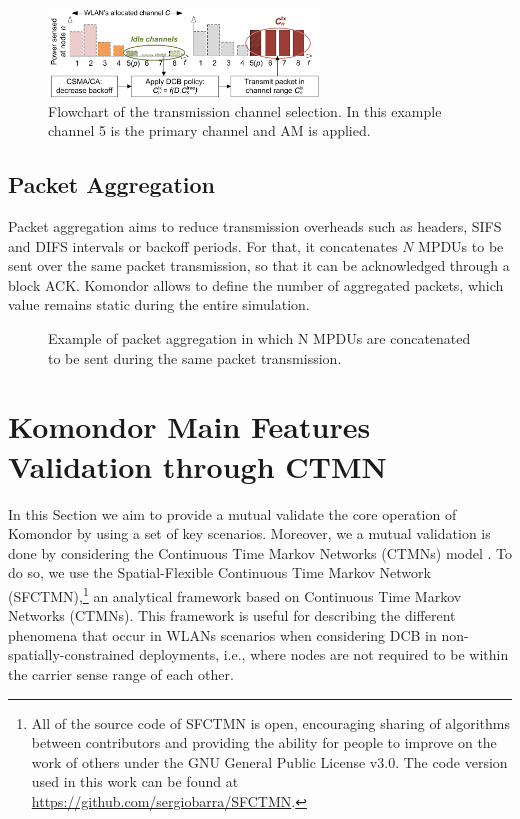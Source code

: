 \documentclass[a4paper]{article}
\begin{document}
	\begin{figure}[h]
		\centering
		\includegraphics[width=0.64\textwidth]{images/cb_policy_flowchart.png}
		\caption{Flowchart of the transmission channel selection. In this example channel 5 is the primary channel and AM is applied.}    
		\label{fig:cb_policy_flowchart}
	\end{figure}
	

	\subsection{Packet Aggregation}
	Packet aggregation aims to reduce transmission overheads such as headers, SIFS and DIFS intervals or backoff periods. For that, it concatenates $N$ MPDUs to be sent over the same packet transmission, so that it can be acknowledged through a block ACK. Komondor allows to define the number of aggregated packets, which value remains static during the entire simulation.
	\begin{figure}[h!]
		\centering
		\caption{Example of packet aggregation in which N MPDUs are concatenated to be sent during the same packet transmission.}
		\label{fig:ampdu}
	\end{figure}
	

\section{Komondor Main Features Validation through CTMN}
\label{section:validations}
	In this Section we aim to provide a mutual validate the core operation of Komondor by using a set of key scenarios. Moreover, we a mutual validation is done by considering the Continuous Time Markov Networks (CTMNs) model \cite{bellalta2014throughput}. To do so, we use the Spatial-Flexible Continuous Time Markov Network (SFCTMN),\footnote{All of the source code of SFCTMN is open, encouraging sharing of algorithms between contributors and providing the ability for people to improve on the work of others under the GNU General Public License v3.0. The code version used in this work can be found at \url{https://github.com/sergiobarra/SFCTMN}.} an analytical framework based on Continuous Time Markov Networks (CTMNs). This framework is useful for describing the different phenomena that occur in WLANs scenarios when considering DCB in non-spatially-constrained deployments, i.e., where nodes are not required to be within the carrier sense range of each other.
\end{document}
